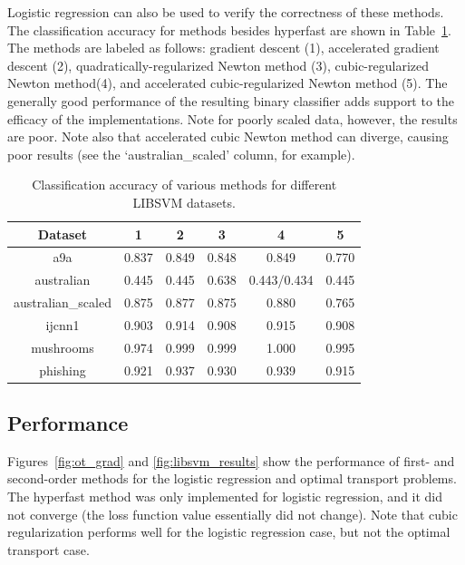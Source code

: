 \documentclass[journal]{IEEEtran}
\begin{document}
Logistic regression can also be used to verify the correctness of these methods. The classification accuracy for methods besides hyperfast are shown in Table~\ref{tab:acc_class_libsvm}. The methods are labeled as follows: gradient descent (1), accelerated gradient descent (2), quadratically-regularized Newton method (3), cubic-regularized Newton method(4), and accelerated cubic-regularized Newton method (5). The generally good performance of the resulting binary classifier adds support to the efficacy of the implementations. Note for poorly scaled data, however, the results are poor. Note also that accelerated cubic Newton method can diverge, causing poor results (see the `australian\_scaled' column, for example).

\begin{table}[]
    \centering
    \begin{tabular}{c|ccccc}
    \textbf{Dataset} & \textbf{1} & \textbf{2} & \textbf{3} & \textbf{4} & \textbf{5} \\
    \hline
    \hline
         a9a & 0.837 & 0.849 & 0.848 & 0.849 & 0.770 \\
         australian & 0.445 & 0.445 & 0.638 & 0.443/0.434 & 0.445 \\
         australian\_scaled & 0.875 & 0.877 & 0.875 & 0.880 & 0.765 \\
         ijcnn1 & 0.903 & 0.914 & 0.908 & 0.915 & 0.908 \\
         mushrooms & 0.974 & 0.999 & 0.999 & 1.000 & 0.995 \\
         phishing & 0.921 & 0.937 & 0.930 & 0.939 & 0.915
    \end{tabular}
    \caption{Classification accuracy of various methods for different LIBSVM datasets.}
    \label{tab:acc_class_libsvm}
\end{table}

\subsection{Performance}

Figures~\ref{fig:ot_grad} and \ref{fig:libsvm_results} show the performance of first- and second-order methods for the logistic regression and optimal transport problems. The hyperfast method was only implemented for logistic regression, and it did not converge (the loss function value essentially did not change). Note that cubic regularization performs well for the logistic regression case, but not the optimal transport case.
\end{document}
